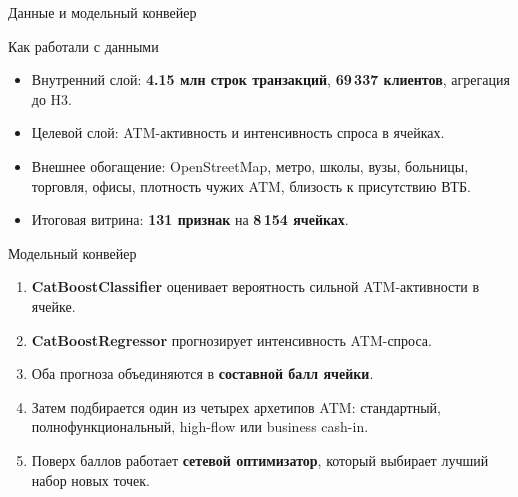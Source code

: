 \documentclass[aspectratio=169,12pt]{beamer}
\begin{document}
\begin{frame}[shrink=8]{Данные и модельный конвейер}
\footnotesize
\begin{block}{Как работали с данными}
\begin{itemize}
\item Внутренний слой: \textbf{4.15 млн строк транзакций}, \textbf{69\,337 клиентов}, агрегация до H3.
\item Целевой слой: ATM-активность и интенсивность спроса в ячейках.
\item Внешнее обогащение: OpenStreetMap, метро, школы, вузы, больницы, торговля, офисы, плотность чужих ATM, близость к присутствию ВТБ.
\item Итоговая витрина: \textbf{131 признак} на \textbf{8\,154 ячейках}.
\end{itemize}
\end{block}

\begin{block}{Модельный конвейер}
\begin{enumerate}
\item \textbf{CatBoostClassifier} оценивает вероятность сильной ATM-активности в ячейке.
\item \textbf{CatBoostRegressor} прогнозирует интенсивность ATM-спроса.
\item Оба прогноза объединяются в \textbf{составной балл ячейки}.
\item Затем подбирается один из четырех архетипов ATM: стандартный, полнофункциональный, high-flow или business cash-in.
\item Поверх баллов работает \textbf{сетевой оптимизатор}, который выбирает лучший набор новых точек.
\end{enumerate}
\end{block}
\end{frame}
\end{document}
